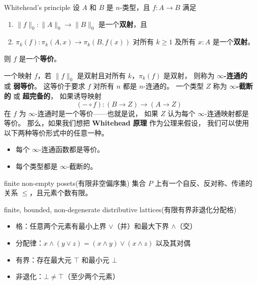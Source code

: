 \documentclass{beamer}
\begin{document}
\begin{frame}{Whitehead's principle \cite{hottbook}}
设 $A$ 和 $B$ 是 $n$-类型，且 $f : A \to B$ 满足
\begin{enumerate}
    \item[(i)] $\|f\|_0 : \|A\|_0 \to \|B\|_0$ 是一个\textbf{双射}，且
    \item[(ii)] $\pi_k(f) : \pi_k(A, x) \to \pi_k(B, f(x))$ 对所有 $k \geq 1$ 及所有 $x : A$ 是一个\textbf{双射}。
\end{enumerate}
则 $f$ 是一个\textbf{等价}。

\vspace{5mm}
一个映射 $f$，若 $\|f\|_0$ 是双射且对所有 $k$，$\pi_k(f)$ 是双射，
则称为 \textbf{$\infty$-连通的} 或 \textbf{弱等价}。
这等价于要求 $f$ 对所有 $n$ 都是 $n$-连通的。
一个类型 $Z$ 称为 \textbf{$\infty$-截断的} 或 \textbf{超完备的}，
如果诱导映射
\[
(- \circ f) : (B \to Z) \to (A \to Z)
\]
在 $f$ 为 $\infty$-连通时是一个等价——也就是说，
如果 $Z$ 认为每个 $\infty$-连通映射都是等价。
那么，如果我们想把 \textbf{Whitehead 原理} 作为公理来假设，
我们可以使用以下两种等价形式中的任意一种。

\begin{itemize}
    \item 每个 $\infty$-连通函数都是等价。
    \item 每个类型都是 $\infty$-截断的。
\end{itemize}
\end{frame}

\begin{frame}{finite non-empty posets(有限非空偏序集)}
集合 $P$ 上有一个自反、反对称、传递的关系 $≤$，且元素个数有限。
\end{frame}

\begin{frame}{finite, bounded, non-degenerate distributive lattices(有限有界非退化分配格)}
  \begin{itemize}
  \item 格：任意两个元素有最小上界 $∨$（并）和最大下界 $∧$（交）

  \item 分配律：$x∧(y∨z)=(x∧y)∨(x∧z)$ 以及其对偶

  \item 有界：存在最大元 $⊤$ 和最小元 $⊥$

  \item 非退化：$⊥≠⊤$（至少两个元素）
\end{itemize}
\end{frame}
\end{document}
